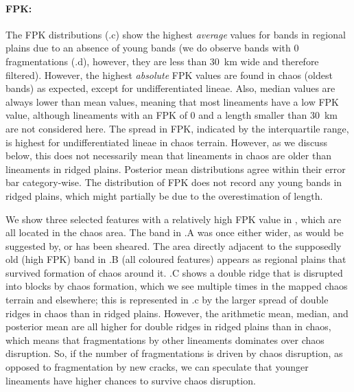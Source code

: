 \paragraph{FPK:}
The FPK distributions (.c) show the highest \textit{average} values for bands in regional plains due to an absence of young bands (we do observe bands with 0 fragmentations (.d), however, they are less than 30~km wide and therefore filtered). However, the highest \textit{absolute} FPK values are found in chaos (oldest bands) as expected, except for undifferentiated lineae. Also, median values are always lower than mean values, meaning that most lineaments have a low FPK value, although lineaments with an FPK of 0 and a length smaller than \qty{30}{\km} are not considered here. The spread in FPK, indicated by the interquartile range, is highest for undifferentiated lineae in chaos terrain. However, as we discuss below, this does not necessarily mean that lineaments in chaos are older than lineaments in ridged plains. Posterior mean distributions agree within their error bar category-wise. The distribution of FPK does not record any young bands in ridged plains, which might partially be due to the overestimation of length.

We show three selected features with a relatively high FPK value in , which are all located in the chaos area. The band in .A was once either wider, as would be suggested by, or has been sheared. The area directly adjacent to the supposedly old (high FPK) band in .B (all coloured features) appears as regional plains that survived formation of chaos around it. .C shows a double ridge that is disrupted into blocks by chaos formation, which we see multiple times in the mapped chaos terrain and elsewhere; this is represented in .c by the larger spread of double ridges in chaos than in ridged plains. However, the arithmetic mean, median, and posterior mean are all higher for double ridges in ridged plains than in chaos, which means that fragmentations by other lineaments dominates over chaos disruption. So, if the number of fragmentations is driven by chaos disruption, as opposed to fragmentation by new cracks, we can speculate that younger lineaments have higher chances to survive chaos disruption. 



